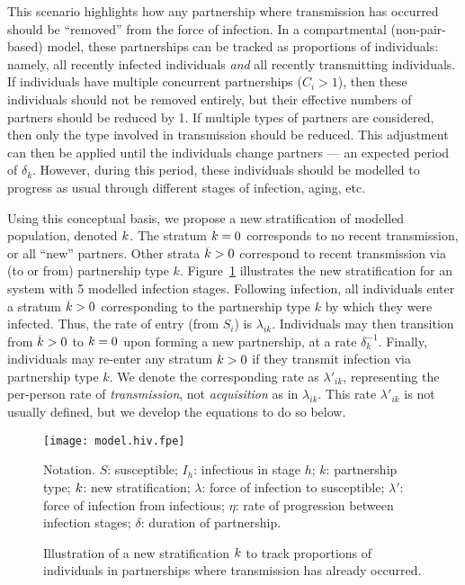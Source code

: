 \par
This scenario highlights how any partnership where transmission has occurred
should be ``removed'' from the force of infection.
In a compartmental (non-pair-based) model,
these partnerships can be tracked as proportions of individuals:
namely, all recently infected individuals \emph{and} all recently transmitting individuals.
If individuals have multiple concurrent partnerships ($C_{i} > 1$),
then these individuals should not be removed entirely,
but their effective numbers of partners should be reduced by 1.
If multiple types of partners are considered,
then only the type involved in transmission should be reduced.
This adjustment can then be applied until the individuals change partners
--- an expected period of $\delta_k$.
However, during this period, these individuals should be modelled
to progress as usual through different stages of infection, aging, etc.
\par
Using this conceptual basis,
we propose a new stratification of modelled population, denoted $\k$.
The stratum $\k = 0$ corresponds to no recent transmission, or all ``new'' partners.
Other strata $\k > 0$ correspond to recent transmission via (to or from) partnership type $k$.
Figure~\ref{fig:model.hk} illustrates the new stratification
for an system with 5 modelled infection stages.
Following infection, all individuals enter a stratum $\k > 0$
corresponding to the partnership type $k$ by which they were infected.
Thus, the rate of entry (from $S_i$) is $\lambda_{ik}$.
Individuals may then transition from $\k > 0$ to $\k = 0$
upon forming a new partnership, at a rate $\delta_k^{-1}$.
Finally, individuals may re-enter any stratum $\k > 0$
if they transmit infection via partnership type $k$.
We denote the corresponding rate as $\lambda'_{ik}$,
representing the per-person rate of \emph{transmission},
not \emph{acquisition} as in $\lambda_{ik}$.
This rate $\lambda'_{ik}$ is not usually defined,
but we develop the equations to do so below.
\begin{figure}
  \centerline{\texttt{[image: model.hiv.fpe]}}
  \caption{Illustration of a new stratification $\k$ to track
    proportions of individuals in partnerships where transmission has already occurred.}
  \label{fig:model.hk}
  \floatfoot
  Notation.
  $S$: susceptible;
  $I_h$: infectious in stage $h$;
  $k$: partnership type;
  $\k$: new stratification;
  $\lambda$: force of infection to susceptible;
  $\lambda'$: force of infection from infectious;
  $\eta$: rate of progression between infection stages;
  $\delta$: duration of partnership.
\end{figure}
